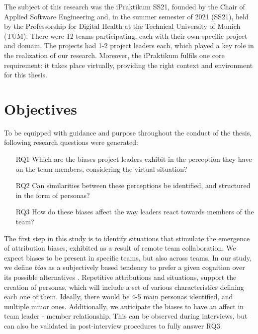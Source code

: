 The subject of this research was the iPraktikum SS21, founded by the Chair of Applied Software Engineering and,  in the summer semester of 2021 (SS21),  held by the Professorship for Digital Health at the Technical University of Munich (TUM). There were 12 teams participating, each with their own specific project and domain. The projects had 1-2 project leaders each, which played a key role in the realization of our research. Moreover, the iPraktikum fulfils one core requirement: it takes place virtually, providing the right context and environment for this thesis.


\section{Objectives} \label{Objectives}


To be equipped with guidance and purpose throughout the conduct of the thesis, following research questions were generated:
\begin{itemize}
	\item [RQ1] Which are the biases project leaders exhibit in the perception they have on the team members, considering the virtual situation?
	\item [RQ2] Can similarities between these perceptions be identified, and structured in the form of personas?
	\item [RQ3] How do these biases affect the way leaders react towards members of the team?
\end{itemize}

The first step in this study is to identify situations that stimulate the emergence of attribution biases, exhibited as a result of remote team collaboration. We expect biases to be present in specific teams, but also across teams. In our study, we define \textit{bias} as a subjectively based tendency to prefer a given cognition over its possible alternatives \cite{Kruglanski1983}. Repetitive attributions and situations, support the creation of personas, which will include a set of various characteristics defining each one of them. Ideally, there would be 4-5 main personas identified, and multiple minor ones. Additionally, we anticipate the biases to have an affect in team leader - member relationship. This can be observed during interviews, but can also be validated in post-interview procedures to fully answer RQ3.

